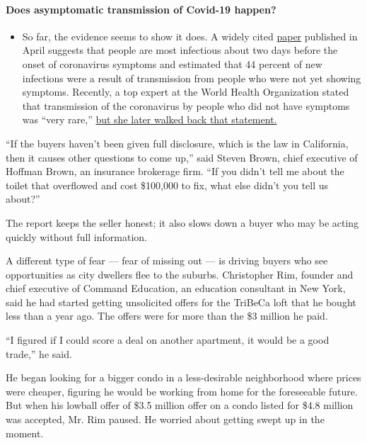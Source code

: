 \begin{itemize}
{  \paragraph{Does asymptomatic transmission of Covid-19
  happen?}\label{does-asymptomatic-transmission-of-covid-19-happen}}

  \begin{itemize}
  \tightlist
  \item
    So far, the evidence seems to show it does. A widely cited
    \href{https://www.nature.com/articles/s41591-020-0869-5}{paper}
    published in April suggests that people are most infectious about
    two days before the onset of coronavirus symptoms and estimated that
    44 percent of new infections were a result of transmission from
    people who were not yet showing symptoms. Recently, a top expert at
    the World Health Organization stated that transmission of the
    coronavirus by people who did not have symptoms was ``very rare,''
    \href{https://www.nytimes.com/2020/06/09/world/coronavirus-updates.html?action=click\&pgtype=Article\&state=default\&region=MAIN_CONTENT_3\&context=storylines_faq\#link-1f302e21}{but
    she later walked back that statement.}
  \end{itemize}
\end{itemize}

``If the buyers haven't been given full disclosure, which is the law in
California, then it causes other questions to come up,'' said Steven
Brown, chief executive of Hoffman Brown, an insurance brokerage firm.
``If you didn't tell me about the toilet that overflowed and cost
\$100,000 to fix, what else didn't you tell us about?''

The report keeps the seller honest; it also slows down a buyer who may
be acting quickly without full information.

A different type of fear --- fear of missing out --- is driving buyers
who see opportunities as city dwellers flee to the suburbs. Christopher
Rim, founder and chief executive of Command Education, an education
consultant in New York, said he had started getting unsolicited offers
for the TriBeCa loft that he bought less than a year ago. The offers
were for more than the \$3 million he paid.

``I figured if I could score a deal on another apartment, it would be a
good trade,'' he said.

He began looking for a bigger condo in a less-desirable neighborhood
where prices were cheaper, figuring he would be working from home for
the foreseeable future. But when his lowball offer of \$3.5 million
offer on a condo listed for \$4.8 million was accepted, Mr. Rim paused.
He worried about getting swept up in the moment.

